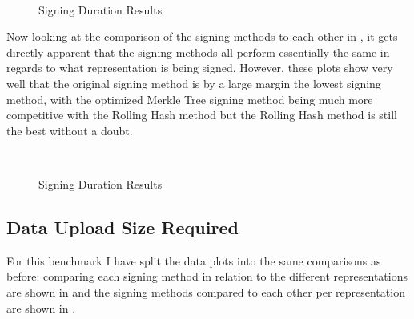 \begin{figure}
    \centering
     \\
    \caption{Signing Duration Results}
    \label{fig:sign-dur1}
\end{figure}

Now looking at the comparison of the signing methods to each other in , it gets directly apparent that the signing methods all perform essentially the same in regards to what representation is being signed. However, these plots show very well that the original signing method is by a large margin the lowest signing method, with the optimized Merkle Tree signing method being much more competitive with the Rolling Hash method but the Rolling Hash method is still the best without a doubt.

\begin{figure}
    \centering
     \\
    \caption{Signing Duration Results}
    \label{fig:sign-dur2}
\end{figure}

\subsection{Data Upload Size Required}

For this benchmark I have split the data plots into the same comparisons as before: comparing each signing method in relation to the different representations are shown in  and the signing methods compared to each other per representation are shown in .

